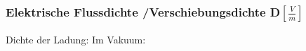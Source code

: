 \subsubsection*{Elektrische Flussdichte /Verschiebungsdichte D$\left[\frac{V}{m}\right]$}
        Dichte der Ladung:
        Im Vakuum: 
